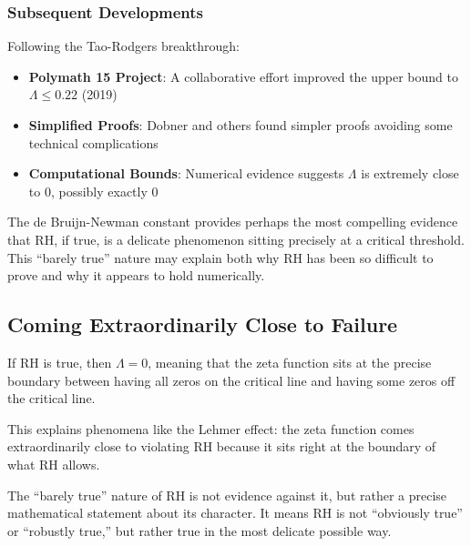 \subsubsection{Subsequent Developments}

Following the Tao-Rodgers breakthrough:

\begin{itemize}
\item \textbf{Polymath 15 Project}: A collaborative effort improved the upper bound to $\Lambda \leq 0.22$ (2019)
\item \textbf{Simplified Proofs}: Dobner and others found simpler proofs avoiding some technical complications
\item \textbf{Computational Bounds}: Numerical evidence suggests $\Lambda$ is extremely close to 0, possibly exactly 0
\end{itemize}

\begin{remark}
The de Bruijn-Newman constant provides perhaps the most compelling evidence that RH, if true, is a delicate phenomenon sitting precisely at a critical threshold. This ``barely true'' nature may explain both why RH has been so difficult to prove and why it appears to hold numerically.
\end{remark}

\subsection{Coming Extraordinarily Close to Failure}
\label{subsec:close_to_failure}

\begin{theorem}
If RH is true, then $\Lambda = 0$, meaning that the zeta function sits at the precise boundary between having all zeros on the critical line and having some zeros off the critical line.
\end{theorem}

This explains phenomena like the Lehmer effect: the zeta function comes extraordinarily close to violating RH because it sits right at the boundary of what RH allows.

\begin{remark}
The ``barely true'' nature of RH is not evidence against it, but rather a precise mathematical statement about its character. It means RH is not ``obviously true'' or ``robustly true,'' but rather true in the most delicate possible way.
\end{remark}

